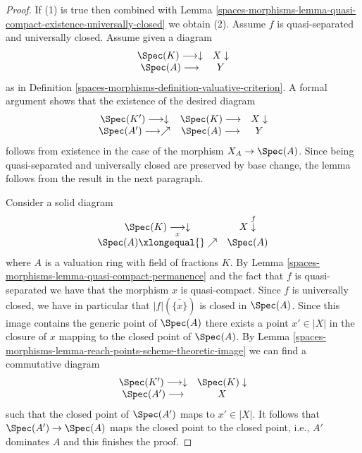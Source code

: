 \begin{proof}
If (1) is true then combined with
Lemma \ref{spaces-morphisms-lemma-quasi-compact-existence-universally-closed}
we obtain (2). Assume $f$ is quasi-separated and universally closed.
Assume given a diagram
$$
\begin{array}{cc}\Spec(K) \longrightarrow\downarrow & X \downarrow \\ \Spec(A) \longrightarrow & Y\end{array}
$$
as in Definition \ref{spaces-morphisms-definition-valuative-criterion}.
A formal argument shows that the existence of the desired diagram
$$
\begin{array}{ccc}\Spec(K') \longrightarrow\downarrow & \Spec(K) \longrightarrow & X \downarrow \\ \Spec(A') \longrightarrow\nearrow & \Spec(A) \longrightarrow & Y\end{array}
$$
follows from existence in the case of the morphism $X_A \to \Spec(A)$.
Since being quasi-separated and universally closed are preserved
by base change, the lemma follows from the result in the next paragraph.

\medskip\noindent
Consider a solid diagram
$$
\begin{array}{cc}\Spec(K) \underset{x}{\longrightarrow}\downarrow & X \overset{f}{\downarrow} \\ \Spec(A) \xlongequal{}\nearrow & \Spec(A)\end{array}
$$
where $A$ is a valuation ring with field of fractions $K$.
By Lemma \ref{spaces-morphisms-lemma-quasi-compact-permanence} and the fact
that $f$ is quasi-separated we have that
the morphism $x$ is quasi-compact.
Since $f$ is universally closed, we have in particular
that $|f|(\overline{\{x\}})$ is closed in $\Spec(A)$.
Since this image contains the generic point of $\Spec(A)$
there exists a point $x' \in |X|$ in the closure
of $x$ mapping to the closed point of $\Spec(A)$.
By Lemma \ref{spaces-morphisms-lemma-reach-points-scheme-theoretic-image}
we can find a commutative diagram
$$
\begin{array}{cc}\Spec(K') \longrightarrow\downarrow & \Spec(K) \downarrow \\ \Spec(A') \longrightarrow & X\end{array}
$$
such that the closed point of $\Spec(A')$ maps to $x' \in |X|$.
It follows that $\Spec(A') \to \Spec(A)$ maps the closed point
to the closed point, i.e., $A'$ dominates $A$ and this finishes the proof.
\end{proof}

